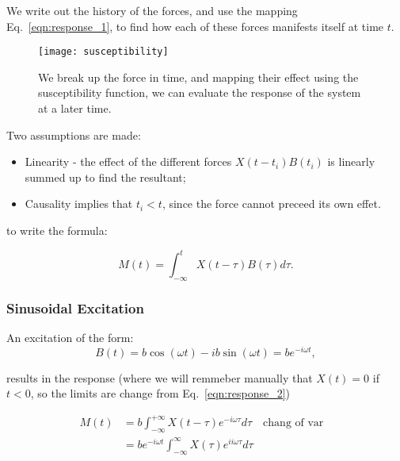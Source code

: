 \noindent We write  out the history of the forces,  and use the mapping
Eq.~\eqref{eqn:response_1}, to find how  each of these forces manifests
itself at time $ t $.

\begin{figure}[h]
  \centering \texttt{[image: susceptibility]}
  \caption{\small  We break  up the  force in  time, and  mapping their
    effect  using  the susceptibility  function,  we  can evaluate  the
    response of the system at a later time.}
\end{figure}

Two assumptions are made:
\begin{itemize}
\item Linearity - the effect of the different forces $ X(t-t_i)B(t_i) $
  is linearly summed up to find the resultant;
\item  Causality implies  that $  t_i  < t  $, since  the force  cannot
  preceed its own effet.
\end{itemize}

\noindent to write the formula:

\begin{framed}\noindent
  \begin{equation}\label{eqn:response_2}
    M(t) = \int_{-\infty}^{t}X(t - \tau)B(\tau)d\tau.
  \end{equation}
\end{framed}

 \subsubsection{Sinusoidal Excitation}
 An excitation of the form:
 \begin{equation}
   B(t) = b\cos(\omega t) - ib\sin(\omega t) = be^{-i\omega t},
 \end{equation}

 \noindent results  in the  response (where  we will  remmeber manually
 that  $ X(t)  =  0  $ if  $  t<0  $, so  the  limits  are change  from
 Eq.~\eqref{eqn:response_2})

 \begin{equation}
   \begin{aligned}
     M(t) &= b\int_{-\infty}^{+\infty}X(t - \tau)e^{-i\omega \tau}d\tau\quad\text{chang of var}&\\
     & = be^{-i\omega t}\int_{-\infty}^{\infty}X(\tau)e^{ii\omega\tau}d\tau&\\
   \end{aligned}
 \end{equation}

